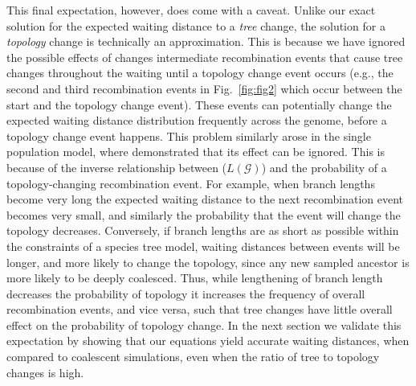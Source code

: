 \documentclass[11pt]{article}
\begin{document}
This final expectation, however, does come with a caveat. 
Unlike our exact solution for the expected waiting distance to a 
\emph{tree} change, the solution for a \emph{topology} change is 
technically an approximation. 
This is because we have ignored the possible effects of changes
intermediate recombination events that cause tree changes 
throughout the waiting until a topology change event occurs
(e.g., the second and third recombination events in Fig.~\ref{fig:fig2} 
which occur between the start and the topology change event). 
These events can potentially change the expected waiting distance
distribution frequently across the genome, before a topology change 
event happens.
This problem similarly arose in the single population model,
where \citet{deng_distribution_2021} 
demonstrated that its effect can be ignored. This is because of the 
inverse relationship between ($L(\mathcal{G})$) 
and the probability of a topology-changing recombination event. 
For example, when branch lengths become very long the expected 
waiting distance to the next recombination event becomes very small, 
and similarly the probability that the event will change the 
topology decreases. Conversely, if branch lengths are as short as possible 
within the constraints of a species tree model, waiting distances between 
events will be longer, and more likely to change the topology, since any 
new sampled ancestor is more likely to be deeply coalesced. 
Thus, while lengthening of branch length decreases the probability of 
topology it increases the frequency of overall recombination events, and 
vice versa, such that tree changes have little overall effect on the 
probability of topology change. In the next section we validate 
this expectation by showing that our equations yield accurate 
waiting distances, when compared to coalescent simulations, 
even when the ratio of tree to topology changes is high.
\end{document}
